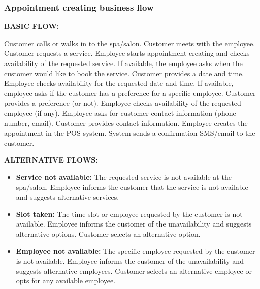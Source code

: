 \documentclass[]{VUMIFTemplateClass}
\begin{document}
\vspace{1cm}


\subsubsection{Appointment creating business flow}

\textbf{BASIC FLOW:}


Customer calls or walks in to the spa/salon.
Customer meets with the employee.
Customer requests a service.
Employee starts appointment creating and checks availability of the requested service.
If available, the employee asks when the customer would like to book the service.
Customer provides a date and time.
Employee checks availability for the requested date and time.
If available, employee asks if the customer has a preference for a specific employee.
Customer provides a preference (or not).
Employee checks availability of the requested employee (if any).
Employee asks for customer contact information (phone number, email).
Customer provides contact information.
Employee creates the appointment in the POS system.
System sends a confirmation SMS/email to the customer.

\textbf{ALTERNATIVE FLOWS:}
\begin{itemize}
    \item \textbf{Service not available: } The requested service is not available at the spa/salon.
    Employee informs the customer that the service is not available and suggests alternative services.
    \item \textbf{Slot taken: } The time slot or employee requested by the customer is not available.
    Employee informs the customer of the unavailability and suggests alternative options.
    Customer selects an alternative option.
    \item \textbf{Employee not available: } The specific employee requested by the customer is not available.
    Employee informs the customer of the unavailability and suggests alternative employees.
    Customer selects an alternative employee or opts for any available employee.
\end{itemize}
\end{document}
